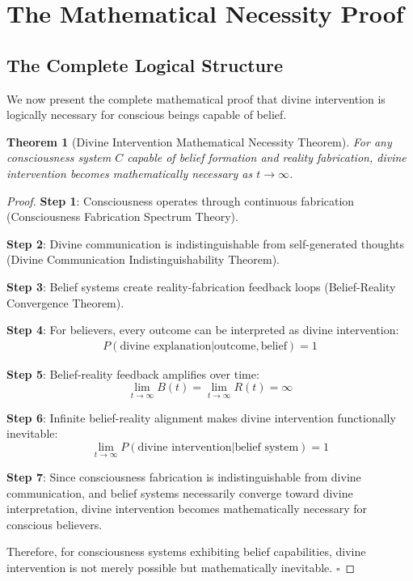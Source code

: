 \documentclass[12pt,a4paper]{article}
\newtheorem{theorem}{Theorem}[section]
\begin{document}
\section{The Mathematical Necessity Proof}

\subsection{The Complete Logical Structure}

We now present the complete mathematical proof that divine intervention is logically necessary for conscious beings capable of belief.

\begin{theorem}[Divine Intervention Mathematical Necessity Theorem]
For any consciousness system $C$ capable of belief formation and reality fabrication, divine intervention becomes mathematically necessary as $t \to \infty$.
\end{theorem}

\begin{proof}
\textbf{Step 1}: Consciousness operates through continuous fabrication (Consciousness Fabrication Spectrum Theory).

\textbf{Step 2}: Divine communication is indistinguishable from self-generated thoughts (Divine Communication Indistinguishability Theorem).

\textbf{Step 3}: Belief systems create reality-fabrication feedback loops (Belief-Reality Convergence Theorem).

\textbf{Step 4}: For believers, every outcome can be interpreted as divine intervention:
\begin{align}
P(\text{divine explanation}|\text{outcome}, \text{belief}) = 1
\end{align}

\textbf{Step 5}: Belief-reality feedback amplifies over time:
$$\lim_{t \to \infty} B(t) = \lim_{t \to \infty} R(t) = \infty$$

\textbf{Step 6}: Infinite belief-reality alignment makes divine intervention functionally inevitable:
$$\lim_{t \to \infty} P(\text{divine intervention}|\text{belief system}) = 1$$

\textbf{Step 7}: Since consciousness fabrication is indistinguishable from divine communication, and belief systems necessarily converge toward divine interpretation, divine intervention becomes mathematically necessary for conscious believers.

Therefore, for consciousness systems exhibiting belief capabilities, divine intervention is not merely possible but mathematically inevitable. $\square$
\end{proof}
\end{document}
